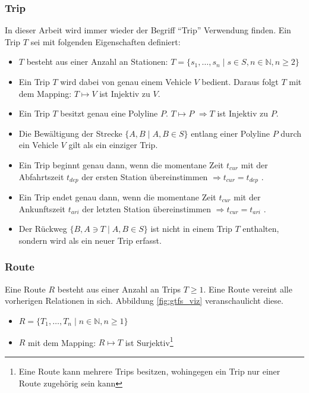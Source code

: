   \subsubsection{Trip}
  \label{ssub:trip}
    In dieser Arbeit wird immer wieder der Begriff "`Trip"' Verwendung finden. Ein Trip $T$ sei mit folgenden Eigenschaften definiert:
    \begin{itemize}
      \item $T$ besteht aus einer Anzahl an Stationen: $T = \{s_1, \dotsc, s_n \;|\; s \in S, n \in \mathbb{N}, n \geq 2 \}$

      \item Ein Trip $T$ wird dabei von genau einem Vehicle $V$ bedient. Daraus folgt $T$ mit dem Mapping: $T \mapsto V$ ist Injektiv zu $V$. 

      \item Ein Trip $T$ besitzt genau eine Polyline $P$. $T \mapsto P$ $ \Rightarrow T$ ist Injektiv zu $P$. 

      \item Die Bewältigung der Strecke $\{A,B \;|\; A, B \in S\}$ entlang einer Polyline $P$ durch ein Vehicle $V$ gilt als ein einziger Trip.

      \item Ein Trip beginnt genau dann, wenn die momentane Zeit $t_{cur}$ mit der Abfahrtszeit $t_{dep}$ der ersten Station übereinstimmen $\Rightarrow t_{cur} = t_{dep} $ .

      \item Ein Trip endet genau dann, wenn die momentane Zeit $t_{cur}$ mit der Ankunftszeit $t_{ari}$ der letzten Station übereinstimmen $\Rightarrow t_{cur} = t_{ari} $ .

      \item Der Rückweg $\{B, A \ni T \;|\; A, B \in S\}$ ist nicht in einem Trip $T$ enthalten, sondern wird als ein neuer Trip erfasst.
    \end{itemize}
    

    \subsubsection{Route}
    \label{ssub:route}
      Eine Route $R$ besteht aus einer Anzahl an Trips $T \geq 1$. Eine Route vereint alle vorherigen Relationen in sich. Abbildung \ref{fig:gtfs_viz} veranschaulicht diese. 

      \begin{itemize}
        \item $R = \{ T_1, \dotsc, T_n \;|\; n \in \mathbb{N}, n \geq 1 \}$

        \item $R$ mit dem Mapping: $R \mapsto T$ ist Surjektiv\footnote{Eine Route kann mehrere Trips besitzen, wohingegen ein Trip nur einer Route zugehörig sein kann} 
      \end{itemize}     

